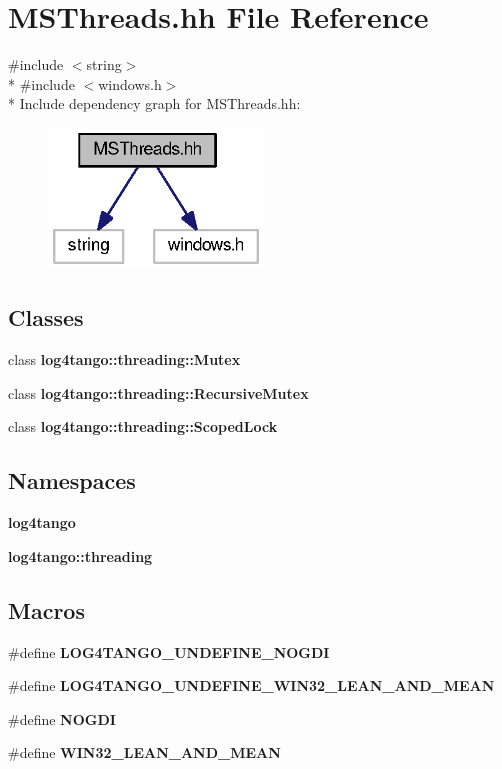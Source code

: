 \section{M\-S\-Threads.\-hh File Reference}
\label{MSThreads_8hh}
{\ttfamily \#include $<$string$>$}\\*
{\ttfamily \#include $<$windows.\-h$>$}\\*
Include dependency graph for M\-S\-Threads.\-hh\-:
\nopagebreak
\begin{figure}[H]
\begin{center}
\leavevmode
\includegraphics[width=162pt]{dc/d39/MSThreads_8hh__incl}
\end{center}
\end{figure}
\subsection*{Classes}
\begin{DoxyCompactItemize}
\item 
class {\bf log4tango\-::threading\-::\-Mutex}
\item 
class {\bf log4tango\-::threading\-::\-Recursive\-Mutex}
\item 
class {\bf log4tango\-::threading\-::\-Scoped\-Lock}
\end{DoxyCompactItemize}
\subsection*{Namespaces}
\begin{DoxyCompactItemize}
\item 
{\bf log4tango}
\item 
{\bf log4tango\-::threading}
\end{DoxyCompactItemize}
\subsection*{Macros}
\begin{DoxyCompactItemize}
\item 
\#define {\bf L\-O\-G4\-T\-A\-N\-G\-O\-\_\-\-U\-N\-D\-E\-F\-I\-N\-E\-\_\-\-N\-O\-G\-D\-I}
\item 
\#define {\bf L\-O\-G4\-T\-A\-N\-G\-O\-\_\-\-U\-N\-D\-E\-F\-I\-N\-E\-\_\-\-W\-I\-N32\-\_\-\-L\-E\-A\-N\-\_\-\-A\-N\-D\-\_\-\-M\-E\-A\-N}
\item 
\#define {\bf N\-O\-G\-D\-I}
\item 
\#define {\bf W\-I\-N32\-\_\-\-L\-E\-A\-N\-\_\-\-A\-N\-D\-\_\-\-M\-E\-A\-N}
\end{DoxyCompactItemize}
